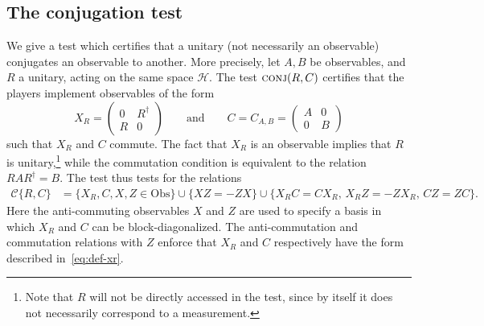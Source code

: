 \documentclass[11pt]{article}
\theoremstyle{remark}
\theoremstyle{definition}
\newcommand{\mH}{\mathcal{H}}
\newcommand{\setft}[1]{\mathrm{#1}}
\newcommand{\Obs}{\setft{Obs}}
\newcommand{\conj}{\textsc{conj}}
\begin{document}
\subsection{The conjugation test}
\label{sec:conj-test}

We give a test which certifies that a unitary (not necessarily an observable) conjugates an observable to another. More precisely, let $A,B$ be observables, and $R$ a unitary, acting on the same space $\mH$. The test $\conj(R,C)$ certifies that the players implement observables of the form
\begin{equation}\label{eq:def-xr}
X_R = \begin{pmatrix} 0 & R^\dagger\\ R & 0 \end{pmatrix}\qquad \text{and}\qquad C = C_{A,B} = \begin{pmatrix} A & 0\\ 0 & B \end{pmatrix}
\end{equation}
such that $X_R$ and $C$ commute. The fact that $X_R$ is an observable implies that $R$ is unitary,\footnote{Note that $R$ will not be directly accessed in the test, since by itself it does not necessarily correspond to a measurement.} while the commutation condition is equivalent to the relation $RAR^\dagger = B$. The test thus tests for the relations
\begin{align*}
 \mathcal{C}\{R,C\} &= \big\{ X_R,C,X,Z\in \Obs\big\} \cup \big\{XZ=-ZX\big\}
\cup \big\{ X_R C = C X_R,\, X_RZ=-Z X_R,\, C Z=ZC\big\}.
\end{align*}
Here the anti-commuting observables $X$ and $Z$ are used to specify a basis in which $X_R$ and $C$ can be block-diagonalized. The anti-commutation and commutation relations with $Z$ enforce that $X_R$ and $C$ respectively have the form described in~\eqref{eq:def-xr}.
\end{document}
